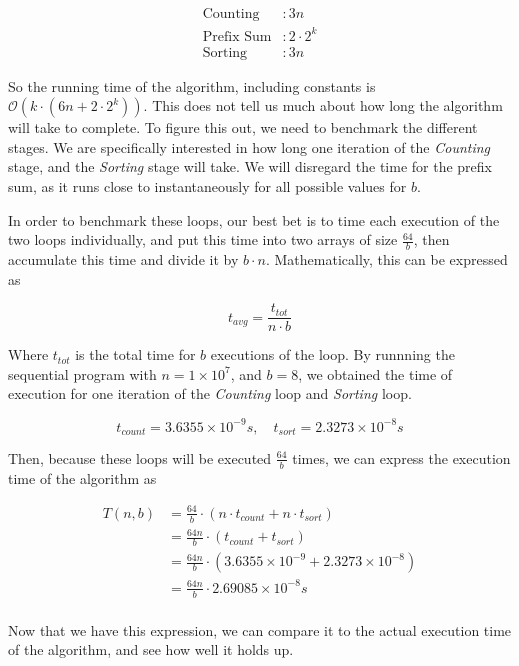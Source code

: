 \documentclass{article}
\begin{document}
\begin{align*}
    \text{Counting} & : 3n \\
    \text{Prefix Sum} & : 2 \cdot 2^{k} \\
    \text{Sorting} & : 3n
\end{align*}

So the running time of the algorithm, including constants is \( \mathcal{O}\left(k \cdot \left( 6n + 2 \cdot 2^{k} \right)\right) \). This does not tell us much about how long the algorithm will take to complete. To figure this out, we need to benchmark the different stages. We are specifically interested in how long one iteration of the \textit{Counting} stage, and the \textit{Sorting} stage will take. We will disregard the time for the prefix sum, as it runs close to instantaneously for all possible values for \( b \).
\medskip

In order to benchmark these loops, our best bet is to time each execution of the two loops individually, and put this time into two arrays of size \( \frac{64}{b} \), then accumulate this time and divide it by \( b \cdot n \). Mathematically, this can be expressed as

\[ t_{avg} = \frac{t_{tot}}{n \cdot  b} \]

Where \( t_{tot} \) is the total time for \( b \) executions of the loop. By runnning the sequential program with \( n = 1 \times 10^{7} \), and \( b = 8 \), we obtained the time of execution for one iteration of the \textit{Counting} loop and \textit{Sorting} loop.

\[ t_{count} = 3.6355 \times 10^{-9}s,\quad t_{sort} = 2.3273 \times  10^{-8} s \]

Then, because these loops will be executed \( \frac{64}{b}  \) times, we can express the execution time of the algorithm as

\begin{align*}
    T\left( n,b \right) &= \frac{64}{b} \cdot \left( n \cdot t_{count} + n \cdot t_{sort} \right) \\
                        &= \frac{64n}{b} \cdot \left( t_{count} + t_{sort} \right)\\
                        &= \frac{64n}{b} \cdot \left( 3.6355 \times 10^{-9} + 2.3273 \times  10^{-8} \right)\\
                        &= \frac{64n}{b} \cdot 2.69085 \times 10^{-8}s\\
\end{align*}

Now that we have this expression, we can compare it to the actual execution time of the algorithm, and see how well it holds up. 
\end{document}
